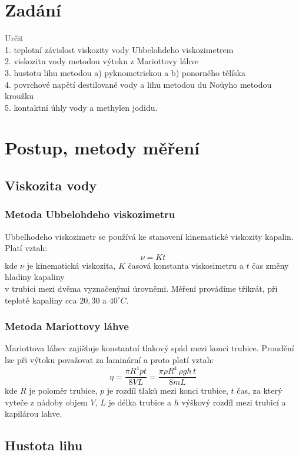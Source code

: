 \documentclass[czech,11pt,a4paper]{article}
\begin{document}
	
	\section{Zadání}
	Určit \\
	1. teplotní závislost viskozity vody Ubbelohdeho viskozimetrem\\
	2. viskozitu vody metodou výtoku z Mariottovy láhve\\
	3. hustotu lihu metodou a) pyknometrickou a b) ponorného tělíska\\
	4. povrchové napětí destilované vody a lihu metodou du Noüyho metodou kroužku\\
	5. kontaktní úhly vody a methylen jodidu.
	
	\section{Postup, metody měření}
	\subsection{Viskozita vody}
	\subsubsection{Metoda Ubbelohdeho viskozimetru}
	Ubbelhodeho viskozimetr se používá ke stanovení kinematické viskozity kapalin. Platí vztah:
	\begin{equation}
		\nu = Kt
	\end{equation}
	kde $\nu$ je kinematická viskozita, $K$ časová konstanta viskosimetru a $t$ čas změny hladiny kapaliny \\v trubici mezi dvěma vyznačenými úrovněmi. Měření provádíme třikrát, při teplotě kapaliny cca $20, 30$ a $40 ^\circ C$.
	\subsubsection{Metoda Mariottovy láhve}
	Mariottova láhev zajišťuje konstantní tlakový spád mezi konci trubice. Proudění lze při výtoku považovat za laminární a proto platí vztah:
	\begin{equation}
		\eta = \frac{\pi R^4 pt}{8VL} = \frac{\pi \rho R^4 \, \rho g h \,t}{8mL}
	\end{equation}
	kde $R$ je poloměr trubice, $p$ je rozdíl tlaků mezi konci trubice, $t$ čas, za který vyteče z nádoby objem  $V$, $L$ je délka trubice a $h$ výškový rozdíl mezi trubicí a kapilárou lahve.
	\subsection{Hustota lihu}
\end{document}
